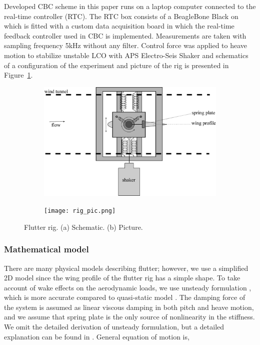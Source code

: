 \documentclass[openacc]{rsproca_new}%
\newcommand{\Fref}[1]{Figure~\ref{#1}}
\begin{document}
Developed CBC scheme in this paper runs on a laptop computer connected to the real-time controller (RTC). The RTC box consists of a BeagleBone Black on which is fitted with a custom data acquisition board \cite{rtc2} in which the real-time feedback controller used in CBC is implemented. Measurements are taken with sampling frequency  5kHz without any filter.  Control force was applied to heave motion to stabilize unstable LCO with APS Electro-Seis Shaker and schematics of a configuration of the experiment and picture of the rig is presented in \Fref{f:rig}.

\begin{figure}
  \centering
  \begin{subfigure}[b]{0.5\linewidth}
    \includegraphics[width=\linewidth]{flutter_rig.eps}
    \caption{}
  \end{subfigure}
  \begin{subfigure}[b]{0.45\linewidth}
    \texttt{[image: rig\_pic.png]}
    \caption{}
  \end{subfigure}
  \caption{Flutter rig. (a) Schematic. (b) Picture.}
  \label{f:rig}
\end{figure}

\subsubsection{Mathematical model}\label{Math_model}
There are many physical models describing flutter; however, we use a simplified 2D model since the wing profile of the flutter rig has a simple shape. To take account of wake effects on the aerodynamic loads, we use unsteady formulation \cite{abdelkefi2013analytical}, which is more accurate compared to quasi-static model \cite{strganac2000identification}. The damping force of the system is assumed as linear viscous damping in both pitch and heave motion, and we assume that spring plate is the only source of nonlinearity in the stiffness. We omit the detailed derivation of unsteady formulation, but a detailed explanation can be found in \cite{abdelkefi2013analytical}. General equation of motion is,
\end{document}
